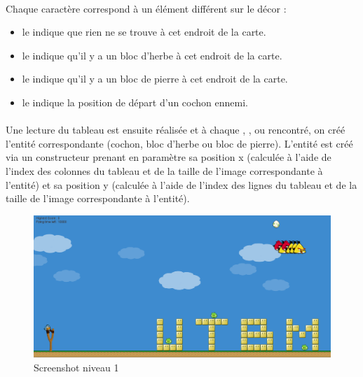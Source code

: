 \documentclass[a4paper,12pt]{report}
\begin{document}
\paragraph{}Chaque caractère correspond à un élément différent sur le décor :
\begin{itemize}
\item le  \guillemotright indique que rien ne se trouve à cet endroit de la carte.
\item le  \guillemotright indique qu’il y a un bloc d’herbe à cet endroit de la carte.
\item le  \guillemotright indique qu’il y a un bloc de pierre à cet endroit de la carte.
\item le  \guillemotright indique la position de départ d’un cochon ennemi.
\end{itemize}
\paragraph{}Une lecture du tableau est ensuite réalisée et à chaque  \guillemotright,  \guillemotright, ou  \guillemotright rencontré, on créé l'entité correspondante (cochon, bloc d'herbe ou bloc de pierre). L'entité est créé via un constructeur prenant en paramètre sa position x (calculée à l'aide de l'index des colonnes du tableau et de la taille de l'image correspondante à l'entité) et sa position y (calculée à l'aide de l'index des lignes du tableau et de la taille de l'image correspondante à l'entité).

\begin{figure}[H]
\begin{center}
\includegraphics[scale=0.4]{images/lvl01image.png} 
\end{center}
\caption{Screenshot niveau 1}
\label{Screenshot niveau 1}
\end{figure}
\end{document}
